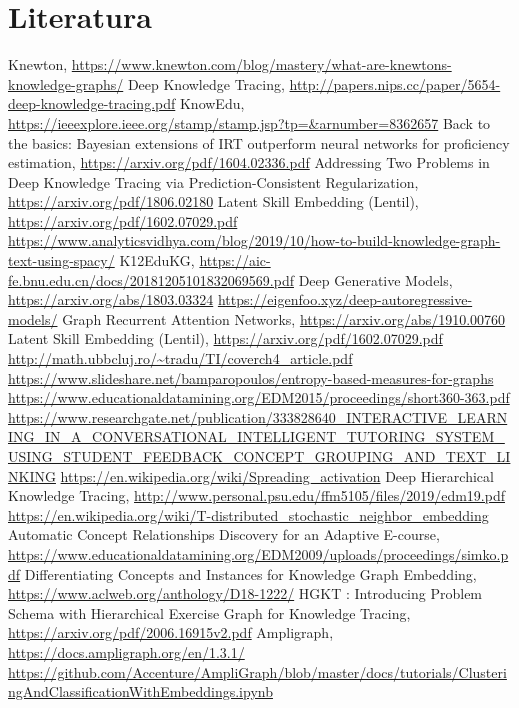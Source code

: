 \chapter{Literatura}
\renewcommand{\bibsection}{}
\begin{thebibliography}{9}
	
	 Knewton, \url{https://www.knewton.com/blog/mastery/what-are-knewtons-knowledge-graphs/}
	 Deep Knowledge Tracing, \url{ http://papers.nips.cc/paper/5654-deep-knowledge-tracing.pdf}
	 KnowEdu, \url{ https://ieeexplore.ieee.org/stamp/stamp.jsp?tp=&arnumber=8362657}
	 Back to the basics: Bayesian extensions of IRT outperform
	neural networks for proficiency estimation, \url{https://arxiv.org/pdf/1604.02336.pdf}
	 Addressing Two Problems in Deep Knowledge Tracing via
	Prediction-Consistent Regularization, \url{https://arxiv.org/pdf/1806.02180}
	 Latent Skill Embedding (Lentil), \url{https://arxiv.org/pdf/1602.07029.pdf}
	 \url{https://www.analyticsvidhya.com/blog/2019/10/how-to-build-knowledge-graph-text-using-spacy/}
	 K12EduKG, \url{https://aic-fe.bnu.edu.cn/docs/20181205101832069569.pdf}
	 Deep Generative Models, \url{https://arxiv.org/abs/1803.03324}
	 \url{https://eigenfoo.xyz/deep-autoregressive-models/}
	 Graph Recurrent Attention Networks, \url{https://arxiv.org/abs/1910.00760}
	 Latent Skill Embedding (Lentil), \url{https://arxiv.org/pdf/1602.07029.pdf}
	 \url{http://math.ubbcluj.ro/~tradu/TI/coverch4_article.pdf}
	 \url{https://www.slideshare.net/bamparopoulos/entropy-based-measures-for-graphs}
	 \url{https://www.educationaldatamining.org/EDM2015/proceedings/short360-363.pdf}
	 \url{https://www.researchgate.net/publication/333828640_INTERACTIVE_LEARNING_IN_A_CONVERSATIONAL_INTELLIGENT_TUTORING_SYSTEM_USING_STUDENT_FEEDBACK_CONCEPT_GROUPING_AND_TEXT_LINKING}
	 \url{https://en.wikipedia.org/wiki/Spreading_activation}
	 Deep Hierarchical Knowledge Tracing, \url{http://www.personal.psu.edu/ffm5105/files/2019/edm19.pdf}
	 \url{https://en.wikipedia.org/wiki/T-distributed_stochastic_neighbor_embedding}
	 Automatic Concept Relationships Discovery for an Adaptive E-course, \url{https://www.educationaldatamining.org/EDM2009/uploads/proceedings/simko.pdf}
	 Differentiating Concepts and Instances for Knowledge Graph Embedding, \url{https://www.aclweb.org/anthology/D18-1222/}
	 HGKT : Introducing Problem Schema with Hierarchical Exercise Graph for Knowledge Tracing, \url{https://arxiv.org/pdf/2006.16915v2.pdf}
	 Ampligraph, \url{https://docs.ampligraph.org/en/1.3.1/}
	 \url{https://github.com/Accenture/AmpliGraph/blob/master/docs/tutorials/ClusteringAndClassificationWithEmbeddings.ipynb}
	
\end{thebibliography}